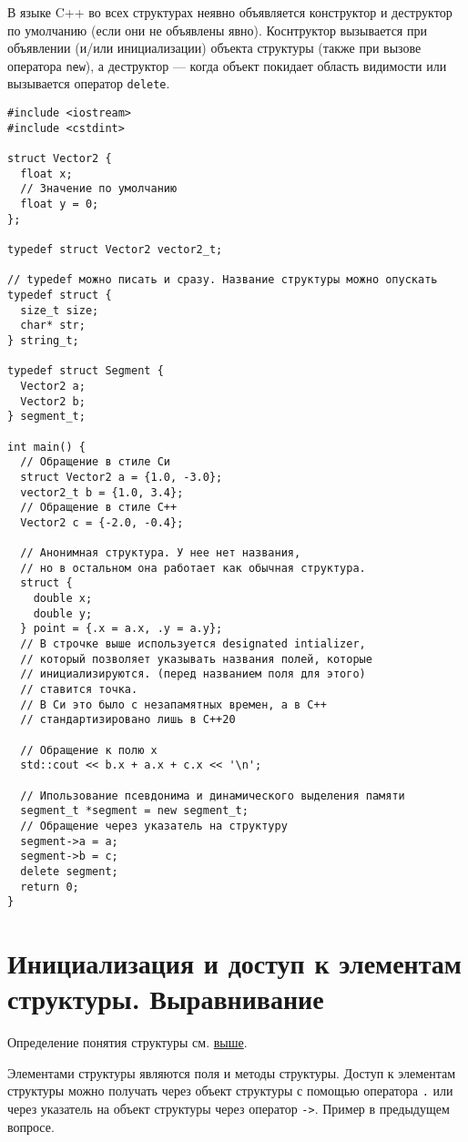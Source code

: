{\small В языке C++ во всех структурах неявно объявляется конструктор и деструктор по умолчанию
(если они не объявлены явно). Коснтруктор вызывается при объявлении (и/или инициализации) объекта
структуры (также при вызове оператора \verb|new|), а деструктор --- когда объект покидает
область видимости или вызывается оператор \verb|delete|.}

\begin{verbatim}
#include <iostream>
#include <cstdint>

struct Vector2 {
  float x;
  // Значение по умолчанию
  float y = 0;
};

typedef struct Vector2 vector2_t;

// typedef можно писать и сразу. Название структуры можно опускать
typedef struct {
  size_t size;
  char* str;
} string_t;

typedef struct Segment {
  Vector2 a;
  Vector2 b;
} segment_t;

int main() {
  // Обращение в стиле Си
  struct Vector2 a = {1.0, -3.0};
  vector2_t b = {1.0, 3.4};
  // Обращение в стиле C++
  Vector2 c = {-2.0, -0.4};

  // Анонимная структура. У нее нет названия,
  // но в остальном она работает как обычная структура.
  struct {
    double x;
    double y;
  } point = {.x = a.x, .y = a.y};
  // В строчке выше используется designated intializer,
  // который позволяет указывать названия полей, которые
  // инициализируются. (перед названием поля для этого)
  // ставится точка.
  // В Си это было с незапамятных времен, а в C++
  // стандартизировано лишь в C++20

  // Обращение к полю x
  std::cout << b.x + a.x + c.x << '\n';
  
  // Ипользование псевдонима и динамического выделения памяти
  segment_t *segment = new segment_t;
  // Обращение через указатель на структуру
  segment->a = a;
  segment->b = c;
  delete segment;
  return 0;
}
\end{verbatim}

\section{Инициализация и доступ к элементам структуры. Выравнивание}
Определение понятия структуры см. \hyperref[def:struct]{выше}.

Элементами структуры являются поля и методы структуры.
Доступ к элементам структуры можно получать через объект структуры
с помощью оператора \verb|.| или через указатель на объект структуры через оператор \verb|->|.
Пример в предыдущем вопросе.

